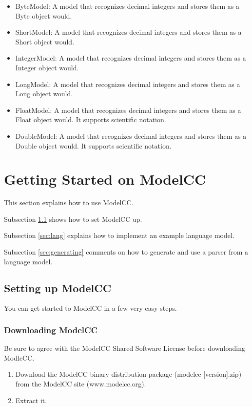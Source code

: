 \documentclass[a4paper,twoside,onecolumn]{article}
\begin{document}
\begin{itemize}
\item ByteModel: A model that recognizes decimal integers and stores them as a Byte object would.
\item ShortModel: A model that recognizes decimal integers and stores them as a Short object would.
\item IntegerModel: A model that recognizes decimal integers and stores them as a Integer object would.
\item LongModel: A model that recognizes decimal integers and stores them as a Long object would.
\item FloatModel: A model that recognizes decimal integers and stores them as a Float object would. It supports scientific notation.
\item DoubleModel: A model that recognizes decimal integers and stores them as a Double object would. It supports scientific notation.
\end{itemize}

\section{Getting Started on ModelCC} \label{sec:gettingstarted}

This section explains how to use ModelCC.

Subsection \ref{sec:install} shows how to set ModelCC up.

Subsection \ref{sec:lang} explains how to implement an example language model.

Subsection \ref{sec:generating} comments on how to generate and use a parser from a language model.

\subsection{Setting up ModelCC} \label{sec:install}

You can get started to ModelCC in a few very easy steps.

\subsubsection{Downloading ModelCC}

Be sure to agree with the ModelCC Shared Software License before downloading ModleCC.

\begin{enumerate}
\item Download the ModelCC binary distribution package (modelcc-[version].zip) from the ModelCC site (www.modelcc.org).
\item Extract it.
\end{enumerate}
\end{document}
